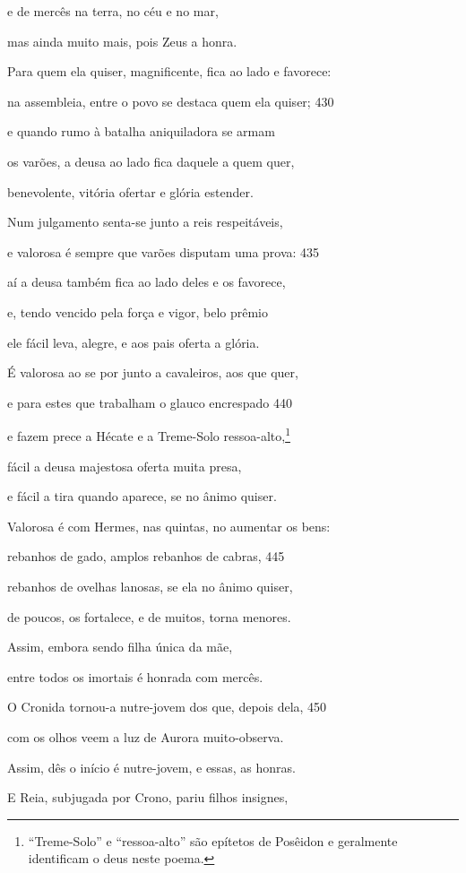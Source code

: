 e de mercês na terra, no céu e no mar,

mas ainda muito mais, pois Zeus a honra.

Para quem ela quiser, magnificente, fica ao lado e favorece:

na assembleia, entre o povo se destaca quem ela quiser; \num{430}

e quando rumo à batalha aniquiladora se armam

os varões, a deusa ao lado fica daquele a quem quer,

benevolente, vitória ofertar e glória estender.

Num julgamento senta-se junto a reis respeitáveis,

e valorosa é sempre que varões disputam uma prova: \num{435}

aí a deusa também fica ao lado deles e os favorece,

e, tendo vencido pela força e vigor, belo prêmio

ele fácil leva, alegre, e aos pais oferta a glória.

É valorosa ao se por junto a cavaleiros, aos que quer,

e para estes que trabalham o glauco encrespado \num{440}

e fazem prece a Hécate e a Treme-Solo ressoa-alto,\footnote{``Treme-Solo'' e ``ressoa-alto'' são epítetos de Posêidon e geralmente identificam o deus neste poema.}

fácil a deusa majestosa oferta muita presa,

e fácil a tira quando aparece, se no ânimo quiser.

Valorosa é com Hermes, nas quintas, no aumentar os bens:

rebanhos de gado, amplos rebanhos de cabras, \num{445}

rebanhos de ovelhas lanosas, se ela no ânimo quiser,

de poucos, os fortalece, e de muitos, torna menores.

Assim, embora sendo filha única da mãe,

entre todos os imortais é honrada com mercês.

O Cronida tornou-a nutre-jovem dos que, depois dela, \num{450}

com os olhos veem a luz de Aurora muito-observa.

Assim, dês o início é nutre-jovem, e essas, as honras.

\medskip

E Reia, subjugada por Crono, pariu filhos insignes,

